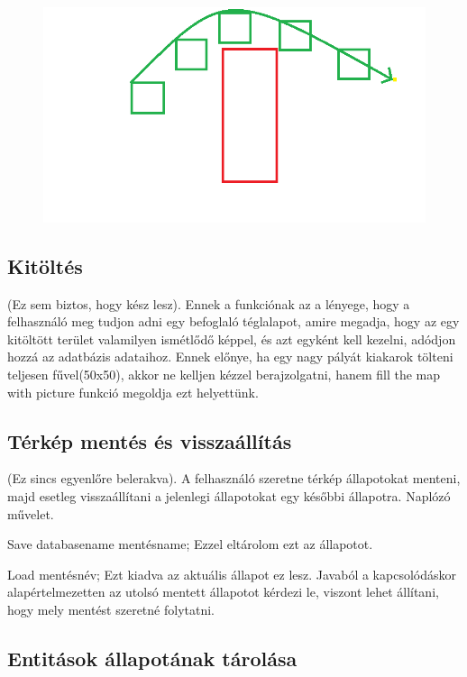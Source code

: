 \begin{figure}[htb]
\begin{center}
    \includegraphics[scale=0.5]{images/path}
    \caption{}
    \label{fig:path}
\end{center}
\end{figure}

\subsection{Kitöltés}

(Ez sem biztos, hogy kész lesz).  Ennek a funkciónak az a lényege, hogy a felhasználó meg tudjon adni egy befoglaló téglalapot, amire megadja, hogy az egy kitöltött terület valamilyen ismétlődő képpel, és azt egyként kell kezelni, adódjon hozzá az adatbázis adataihoz. Ennek előnye, ha egy nagy pályát kiakarok tölteni teljesen fűvel(50x50), akkor ne kelljen kézzel berajzolgatni, hanem fill the map with picture funkció megoldja ezt helyettünk.

\subsection{Térkép mentés és visszaállítás}

(Ez sincs egyenlőre belerakva). A felhasználó szeretne térkép állapotokat menteni, majd esetleg visszaállítani a jelenlegi állapotokat egy későbbi állapotra. Naplózó művelet.

Save databasename mentésname;
Ezzel eltárolom ezt az állapotot.

Load mentésnév;
Ezt kiadva az aktuális állapot ez lesz. Javaból a kapcsolódáskor alapértelmezetten az utolsó mentett állapotot kérdezi le, viszont lehet állítani, hogy mely mentést szeretné folytatni.

\subsection{Entitások állapotának tárolása}

